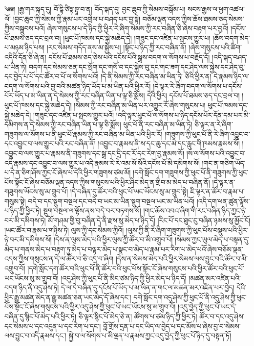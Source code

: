 ༄༅། །རྒྱ་གར་སྐད་དུ། བོ་དྷི་ཙིཏྟ་བྷཱ་བ་ན། བོད་སྐད་དུ། བྱང་ཆུབ་ཀྱི་སེམས་བསྒོམ་པ། སངས་རྒྱས་ལ་ཕྱག་འཚལ་ལོ། །བྱང་ཆུབ་ཀྱི་སེམས་ཀྱི་རྣམ་པར་འགྲེལ་པ་བཤད་པར་བྱ་སྟེ། བཅོམ་ལྡན་འདས་ཀྱིས་ཆོས་ཐམས་ཅད་སེམས་ཀྱིས་བསྒྲུབས་པའོ། ཞེས་གསུངས་པ་དེ་ཉིད་ཀྱི་ཕྱིར་རེ་ཞིག་སེམས་ཀྱི་རང་བཞིན་ཅི་ཞེས་བརྟག་པར་བྱའོ། །དངོས་པོ་ཐམས་ཅད་དང་བྲལ་བ། །ཕུང་པོ་ཁམས་དང་སྐྱེ་མཆེད་དེ། །གཟུང་དང་འཛིན་པ་སྤངས་གྱུར་པ། །ཆོས་བདག་མེད་པ་མཉམ་ཉིད་པས། །རང་སེམས་གདོད་ནས་མ་སྐྱེས་པ། །སྟོང་པ་ཉིད་ཀྱི་རང་བཞིན་ནོ། །ཞེས་གསུངས་པའི་ཚིག་འདིའི་དོན་ཅི་ཞེ་ན། དངོས་པོ་ཐམས་ཅད་ཅེས་པའི་དངོས་པོའི་སྒྲས་བདག་ལ་སོགས་པ་བརྗོད་དོ། །འདི་སྐད་བཤད་པ་ཡིན་ཏེ། བདག་དང་སེམས་ཅན་དང་སྲོག་དང་གསོ་བ་དང་སྐྱེས་བུ་དང་གང་ཟག་དང་ཤེད་ལས་སྐྱེས་དང་ཤེད་བུ་དང་བྱེད་པ་པོ་དང་ཚོར་བ་པོ་ལ་སོགས་པའོ། །དེ་ནི་སེམས་ཀྱི་རང་བཞིན་མ་ཡིན་ཏེ། ཅིའི་ཕྱིར་ན། དེ་རྣམས་ཉིད་ལ་བདག་ལ་སོགས་པའི་བྱ་བའི་མཚན་ཉིད་ཡོད་པ་མ་ཡིན་པའི་ཕྱིར་རོ། །དེ་ལྟར་རེ་ཞིག་བདག་ལ་སོགས་པ་དངོས་པོར་ཡོད་པ་མ་ཡིན་ན་དེ་སེམས་ཀྱི་རང་བཞིན་ཡིན་པ་ལྟ་ཅི་སྨོས། དེའི་ཕྱིར། དངོས་པོ་ཐམས་ཅད་དང་བྲལ་བ། །ཕུང་པོ་ཁམས་དང་སྐྱེ་མཆེད་དེ། །སེམས་ཀྱི་རང་བཞིན་མ་ཡིན་པར་འགྱུར་རོ་ཞེས་གསུངས་པ། ཕུང་པོ་ཁམས་དང་སྐྱེ་མཆེད་དེ། །གཟུང་དང་འཛིན་པ་སྤངས་གྱུར་པའོ། །འདི་ལྟར་ཕུང་པོ་ལ་སོགས་པ་ཉིད་དངོས་པོར་དོན་དམ་པར་མི་དམིགས་ན་དེ་སེམས་ཀྱི་རང་བཞིན་ཡིན་པ་ལྟ་ཅི་སྨོས། ཕུང་པོ་ནི་རང་བཞིན་མ་ཡིན་ཏེ། ཅི་ལྟར་ན་རེ་ཞིག་གཟུགས་ལ་སོགས་པ་ནི་ཕུང་པོ་རྣམས་ཀྱི་རང་བཞིན་མ་ཡིན་པའི་ཕྱིར་རོ། །གཟུགས་ཀྱི་ཕུང་པོ་ནི་རེ་ཞིག་འབྱུང་བ་དང་འབྱུང་བ་ལས་གྱུར་པའི་རང་བཞིན་ནོ། །འབྱུང་བ་རྣམས་ནི་ས་དང་ཆུ་དང་མེ་དང་རླུང་གི་ཁམས་རྣམས་སོ། །འབྱུང་བ་ལས་གྱུར་པ་རྣམས་ནི་གཟུགས་དང་སྒྲ་དང་དྲི་དང་རོ་དང་རེག་བྱ་རྣམས་སོ། །ས་ལ་སོགས་པའི་འབྱུང་བ་འདི་རྣམས་དང་འབྱུང་བ་ལས་གྱུར་པ་འདི་རྣམས་རེ་རེ་འམ་སོ་སོའི་དངོས་པོ་མི་དམིགས་སོ། །གང་ན་གཅིག་ཡོད་པ་དེ་ན་ཅིག་ཤོས་ཀྱང་ངོ་ཞེས་པ་དེའི་ཕྱིར་གཟུགས་ཙམ་མོ། །དགེ་སློང་དག་གཟུགས་ཀྱི་ཕུང་པོ་ནི་གཟུགས་ཀྱི་ཕུང་པོས་སྟོང་ངོ་ཞེས་བཅོམ་ལྡན་འདས་ཀྱིས་གསུངས་པའི་ཕྱིར་ཤིང་མེད་ན་གྲིབ་མ་མེད་པ་བཞིན་ནོ། །དེ་ལྟར་ན་གཟུགས་ཡོངས་སུ་མ་གྲུབ་པོ། །དེ་བཞིན་དུ་ཚོར་བའི་ཕུང་པོ་ཡང་ཡོངས་སུ་མ་གྲུབ་སྟེ། ཇི་ལྟར་ན་ཚོར་བ་རྣམ་པ་གསུམ་སྟེ། བདེ་བ་དང་སྡུག་བསྔལ་དང་བདེ་བ་ཡང་མ་ཡིན་སྡུག་བསྔལ་ཡང་མ་ཡིན་པའོ། །འདི་དག་ཕན་ཚུན་ལྟོས་པ་ཉིད་ཀྱི་ཕྱིར་ཏེ། སྡུག་བསྔལ་ལ་ལྟོས་ནས་བདེ་བར་བཏགས་སོ། །གང་ཆོས་འབའ་ཞིག་གི་རང་བཞིན་ཉིད་ཀྱང་ཉེ་བར་མི་དམིགས་ཏེ། མོ་གཤམ་གྱི་བུ་བཞིན་དེ་ནི་རྫས་སུ་མེད་པ་ཉིད་དོ། །རིང་པོ་དང་ཐུང་ངུ་བཞིན་ཉམས་སུ་མྱོང་ངོ། །ཡང་ཚོར་བ་རྣམ་པ་གཉིས་ཏེ། ལུས་ཀྱི་དང་སེམས་ཀྱིའོ། །ལུས་ཀྱི་ནི་རེ་ཞིག་གཟུགས་ཀྱི་ཕུང་པོས་བསྡུས་པའི་ཕྱིར་ཉེ་བར་མི་དམིགས་སོ། །དེས་ན་ལུས་མེད་པའི་ཕྱིར་ལུས་ཀྱི་ཚོར་བ་མི་འགྲུབ་པོ། །སེམས་ཀྱང་ཡུལ་མེད་པ་བསྟན་དུ་མེད་པ་གནས་མེད་པ་བརྟག་ཏུ་མེད་པ་བལྟར་མེད་པ་སྣང་བ་མེད་པ་རྣམ་པར་རིག་པ་མེད་པའོ་ཞེས་བཅོམ་ལྡན་འདས་ཀྱིས་གསུངས་ན་དེ་ལ་ཚོར་བ་ཅི་འདྲ་བ་ཞིག །དེས་ན་སེམས་མེད་པའི་ཕྱིར་སེམས་ལས་བྱུང་བའི་ཚོར་བ་མི་འགྲུབ་བོ། །དགེ་སློང་དག་ཚོར་བའི་ཕུང་པོ་ནི་ཚོར་བའི་ཕུང་པོས་སྟོང་ངོ་ཞེས་གསུངས་པའི་ཕྱིར་ཚོར་བའི་ཕུང་པོ་ཡང་ཡོངས་སུ་མ་གྲུབ་བོ། །འདུ་ཤེས་ཀྱི་ཕུང་པོ་ནི་མིང་ཙམ་ཉིད་ཀྱི་ཕྱིར་མེད་པ་ཉིད་དོ། །མཚན་མར་འཛིན་པའི་བདག་ཉིད་ནི་འདུ་ཤེས་ཏེ། དེ་ལ་དེ་བཞིན་དུ་དངོས་པོ་ཡོད་པ་མ་ཡིན་ན་གང་ལ་མཚན་མར་འཛིན་པར་བྱེད། དེའི་ཕྱིར་རྒྱུ་མཚན་མེད་ན་རྒྱུ་མཚན་ཅན་ཡང་མེད་དོ་ཞེས་དང་། དགེ་སློང་དག་འདུ་ཤེས་ཀྱི་ཕུང་པོ་ནི་འདུ་ཤེས་ཀྱི་ཕུང་པོས་སྟོང་ངོ་ཞེས་གསུངས་པའི་ཕྱིར་འདུ་ཤེས་ཀྱི་ཕུང་པོ་ཡང་ཡོངས་སུ་མ་གྲུབ་བོ། །འདུ་བྱེད་ཀྱི་ཕུང་པོ་ཡང་དེ་བཞིན་དུ་སྙིང་པོ་མེད་པའི་ཕྱིར་ཏེ། ཅི་ལྟར་སྙིང་པོ་མེད་ཅེ་ན། ཚོགས་པ་ཙམ་ཉིད་ཀྱི་ཕྱིར་ཏེ། ཚོར་བ་དང་འདུ་ཤེས་དང་སེམས་པ་དང་འདུན་པ་དང་རེག་པ་དང་། བློ་གྲོས་དྲན་པ་དང་ཡིད་ལ་བྱེད་པ་དང་མོས་པ་ཞེས་བྱ་བ་སེམས་ལས་བྱུང་བ་འདི་རྣམས་དང་། སྐྱེ་བ་ལ་སོགས་པ་མི་ལྡན་པ་རྣམས་ཀྱང་འདུ་བྱེད་ཀྱི་ཕུང་པོ་ཉིད་དུ་བསྟན་ཏོ། 